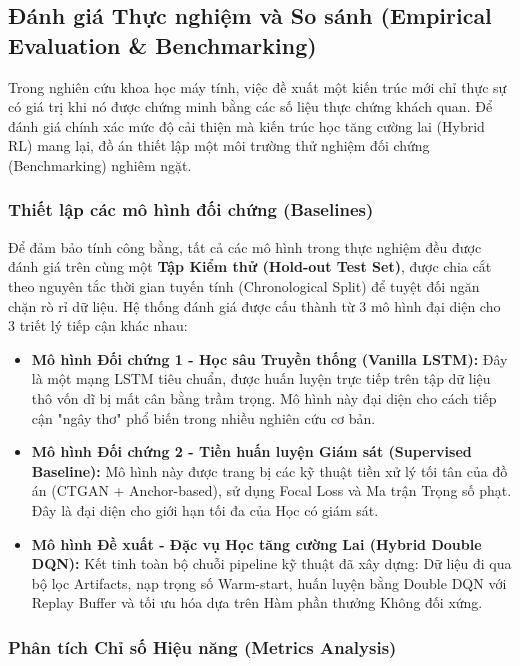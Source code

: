 \subsection{Đánh giá Thực nghiệm và So sánh (Empirical Evaluation \& Benchmarking)}
\label{sec:5_6}

Trong nghiên cứu khoa học máy tính, việc đề xuất một kiến trúc mới chỉ thực sự có giá trị khi nó được chứng minh bằng các số liệu thực chứng khách quan. Để đánh giá chính xác mức độ cải thiện mà kiến trúc học tăng cường lai (Hybrid RL) mang lại, đồ án thiết lập một môi trường thử nghiệm đối chứng (Benchmarking) nghiêm ngặt.

\subsubsection{Thiết lập các mô hình đối chứng (Baselines)}

Để đảm bảo tính công bằng, tất cả các mô hình trong thực nghiệm đều được đánh giá trên cùng một \textbf{Tập Kiểm thử (Hold-out Test Set)}, được chia cắt theo nguyên tắc thời gian tuyến tính (Chronological Split) để tuyệt đối ngăn chặn rò rỉ dữ liệu. Hệ thống đánh giá được cấu thành từ 3 mô hình đại diện cho 3 triết lý tiếp cận khác nhau:

\begin{itemize}
    \item \textbf{Mô hình Đối chứng 1 - Học sâu Truyền thống (Vanilla LSTM):} Đây là một mạng LSTM tiêu chuẩn, được huấn luyện trực tiếp trên tập dữ liệu thô vốn dĩ bị mất cân bằng trầm trọng. Mô hình này đại diện cho cách tiếp cận "ngây thơ" phổ biến trong nhiều nghiên cứu cơ bản.
    \item \textbf{Mô hình Đối chứng 2 - Tiền huấn luyện Giám sát (Supervised Baseline):} Mô hình này được trang bị các kỹ thuật tiền xử lý tối tân của đồ án (CTGAN + Anchor-based), sử dụng Focal Loss và Ma trận Trọng số phạt. Đây là đại diện cho giới hạn tối đa của Học có giám sát.
    \item \textbf{Mô hình Đề xuất - Đặc vụ Học tăng cường Lai (Hybrid Double DQN):} Kết tinh toàn bộ chuỗi pipeline kỹ thuật đã xây dựng: Dữ liệu đi qua bộ lọc Artifacts, nạp trọng số Warm-start, huấn luyện bằng Double DQN với Replay Buffer và tối ưu hóa dựa trên Hàm phần thưởng Không đối xứng.
\end{itemize}

\subsubsection{Phân tích Chỉ số Hiệu năng (Metrics Analysis)}

